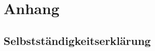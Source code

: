 \documentclass[11pt,a4paper]{article}
\begin{document}


\newpage
\section{Anhang}
\subsection{Selbstständigkeitserklärung}
\end{document}
